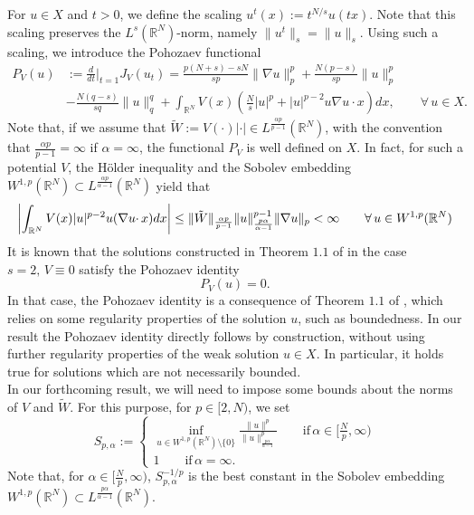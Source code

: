 \documentclass[11pt,reqno]{amsart}
\theoremstyle{definition}
\numberwithin{equation}{section}
\numberwithin{theorem}{section}
\numberwithin{equation}{section}
\numberwithin{theorem}{section}
\newcommand{\R}{\mathbb{R}}
\begin{document}
For $u\in X$ and $t>0$, we define the scaling $u^t(x):=t^{N/s}u(tx)$. Note that this scaling preserves the $L^s(\R^N)$-norm, namely $\|u^t\|_s=\|u\|_s$. Using such a scaling, we introduce the Pohozaev functional
\begin{equation}\label{pohozaev-functional}
\begin{aligned}
P_V(u)&:=\frac{d}{dt}\bigg|_{t=1}J_V(u_t)=\frac{p(N+s)-sN}{sp}\|\nabla u\|^p_p+\frac{N(p-s)}{sp}\|u\|^p_p\\
&-\frac{N(q-s)}{sq}\|u\|^q_q+\int_{\R^N} V(x)\left(\frac{N}{s}|u|^p+|u|^{p-2}u \nabla u\cdotp x\right)dx,\qquad\forall\,u\in X.
\end{aligned}    
\end{equation}
Note that, if we assume that $\tilde{W}:=V(\cdotp)|\cdotp|\in L^{\frac{\alpha p}{p-1}}(\R^N)$, with the convention that $\frac{\alpha p}{p-1}=\infty$ if $\alpha=\infty$, the functional $P_V$ is well defined on $X$. In fact, for such a potential $V$, the H\"{o}lder inequality and the Sobolev embedding $W^{1,p}(\R^N)\subset L^{\frac{\alpha p}{\alpha-1}}(\R^N)$ yield that
\begin{equation}\notag
\left|\int_{\R^N} V(x)|u|^{p-2} u(\nabla u\cdotp x)dx\right|\le \|\tilde{W}\|_{\frac{\alpha p}{p-1}}\|u\|_{\frac{p\alpha}{\alpha-1}}^{p-1}\|\nabla u\|_p<\infty\qquad\forall\,u\in W^{1,p}(\R^N)
\end{equation}
It is known that the solutions constructed in Theorem $1.1$ of \cite{WLZL} in the case $s=2,\,V\equiv 0$ satisfy the Pohozaev identity
\begin{equation}\label{pohozaev-identity}
P_V(u)=0.  
\end{equation}
In that case, the Pohozaev identity is a consequence of Theorem $1.1$ of \cite{guedda1989quasilinear}, which relies on some regularity properties of the solution $u$, such as boundedness. In our result the Pohozaev identity directly follows by construction, without using further regularity properties of the weak solution $u\in X$. In particular, it holds true for solutions which are not necessarily bounded.\\

In our forthcoming result, we will need to impose some bounds about the norms of $V$ and $\tilde{W}$. For this purpose, for $p\in[2,N)$, we set $$S_{p,\alpha}:=\begin{cases}\inf_{u\in W^{1,p}(\R^N)\setminus\{0\}}\frac{\|u\|^p}{\|u\|_\frac{p\alpha}{\alpha-1}^p}\qquad\text{if}\,\alpha\in[\frac{N}{p},\infty)\\
1\qquad\text{if}\,\alpha=\infty.
\end{cases}$$ 
Note that, for $\alpha\in[\frac{N}{p},\infty)$, $S_{p,\alpha}^{-1/p}$ is the best constant in the Sobolev embedding $W^{1,p}(\R^N)\subset L^\frac{p\alpha}{\alpha-1}(\R^N)$.\\
\end{document}
